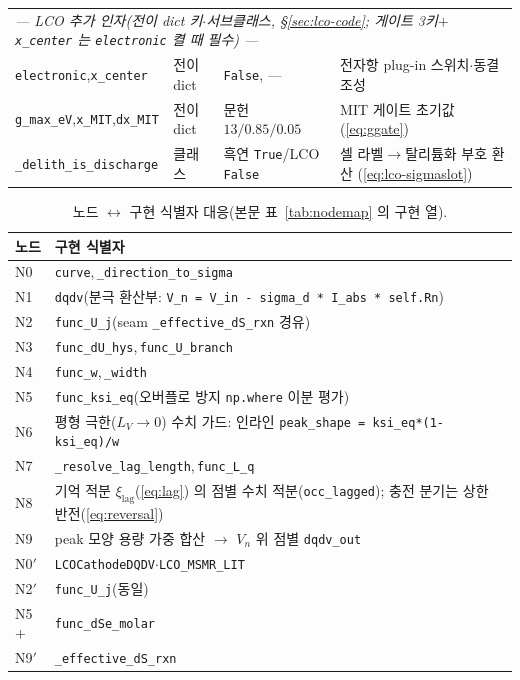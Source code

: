 \documentclass[11pt,a4paper]{article}
\newcommand{\code}[1]{\texttt{#1}}
\begin{document}
\begin{table}[htbp]
\begin{tabular}{l l l l}
\multicolumn{4}{l}{\emph{— LCO 추가 인자(전이 dict 키$\cdot$서브클래스, \S\ref{sec:lco-code}; 게이트 3키$+$\code{x\_center} 는 \code{electronic} 켤 때 필수) —}}\\
\code{electronic},\code{x\_center} & 전이 dict & \code{False}, — & 전자항 plug-in 스위치$\cdot$동결 조성 \\
\code{g\_max\_eV},\code{x\_MIT},\code{dx\_MIT} & 전이 dict & 문헌 $13/0.85/0.05$ & MIT 게이트 초기값 (\eqref{eq:ggate}) \\
\code{\_delith\_is\_discharge} & 클래스 & 흑연 \code{True}/LCO \code{False} & 셀 라벨$\to$탈리튬화 부호 환산 (\eqref{eq:lco-sigmaslot}) \\
\bottomrule
\end{tabular}
\end{table}

\begin{table}[htbp]
\centering
\renewcommand{\arraystretch}{1.3}
\caption{노드 $\leftrightarrow$ 구현 식별자 대응(본문 표~\ref{tab:nodemap} 의 구현 열).}
\label{tab:nodecode}
\begin{tabular}{l p{}}
\toprule
노드 & 구현 식별자 \\
\midrule
N0 & \code{curve},\,\code{\_direction\_to\_sigma} \\
N1 & \code{dqdv}(분극 환산부: \code{V\_n = V\_in - sigma\_d * I\_abs * self.Rn}) \\
N2 & \code{func\_U\_j}(seam \code{\_effective\_dS\_rxn} 경유) \\
N3 & \code{func\_dU\_hys},\,\code{func\_U\_branch} \\
N4 & \code{func\_w},\,\code{\_width} \\
N5 & \code{func\_ksi\_eq}(오버플로 방지 \code{np.where} 이분 평가) \\
N6 & 평형 극한($L_V\!\to\!0$) 수치 가드: 인라인 \code{peak\_shape = ksi\_eq*(1-ksi\_eq)/w} \\
N7 & \code{\_resolve\_lag\_length},\,\code{func\_L\_q} \\
N8 & 기억 적분 $\xi_\mathrm{lag}$(\eqref{eq:lag}) 의 점별 수치 적분(\code{occ\_lagged}); 충전 분기는 상한 반전(\eqref{eq:reversal}) \\
N9 & peak 모양 용량 가중 합산 $\to$ $V_n$ 위 점별 \code{dqdv\_out} \\
N0$'$ & \code{LCOCathodeDQDV}$\cdot$\code{LCO\_MSMR\_LIT} \\
N2$'$ & \code{func\_U\_j}(동일) \\
N5$+$ & \code{func\_dSe\_molar} \\
N9$'$ & \code{\_effective\_dS\_rxn} \\
\bottomrule
\end{tabular}
\end{table}
\end{document}
